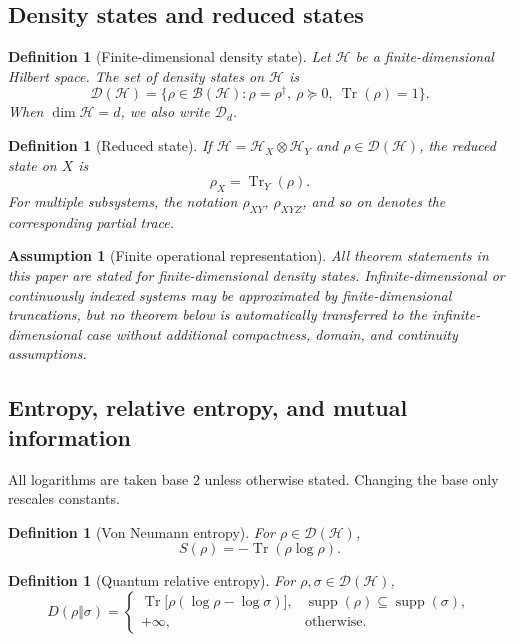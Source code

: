 \documentclass[11pt]{article}
\newtheorem{definition}[theorem]{Definition}
\newtheorem{assumption}[theorem]{Assumption}
\newcommand{\D}{\mathcal{D}}
\newcommand{\Hcal}{\mathcal{H}}
\newcommand{\Tr}{\operatorname{Tr}}
\newcommand{\supp}{\operatorname{supp}}
\newcommand{\1}{\mathbf{1}}
\begin{document}
\subsection{Density states and reduced states}

\begin{definition}[Finite-dimensional density state]
Let \(\Hcal\) be a finite-dimensional Hilbert space. The set of density states on \(\Hcal\) is
\[
\D(\Hcal)
=
\{\rho\in\mathcal B(\Hcal):\rho=\rho^\dagger,\ \rho\succeq0,\ \Tr(\rho)=1\}.
\]
When \(\dim \Hcal=d\), we also write \(\D_d\).
\end{definition}

\begin{definition}[Reduced state]
If \(\Hcal=\Hcal_X\otimes\Hcal_Y\) and \(\rho\in\D(\Hcal)\), the reduced state on \(X\) is
\[
\rho_X=\Tr_Y(\rho).
\]
For multiple subsystems, the notation \(\rho_{XY}\), \(\rho_{XYZ}\), and so on denotes the corresponding partial trace.
\end{definition}

\begin{assumption}[Finite operational representation]
All theorem statements in this paper are stated for finite-dimensional density states. Infinite-dimensional or continuously indexed systems may be approximated by finite-dimensional truncations, but no theorem below is automatically transferred to the infinite-dimensional case without additional compactness, domain, and continuity assumptions.
\end{assumption}

\subsection{Entropy, relative entropy, and mutual information}

All logarithms are taken base \(2\) unless otherwise stated. Changing the base only rescales constants.

\begin{definition}[Von Neumann entropy]
For \(\rho\in\D(\Hcal)\),
\[
S(\rho)=-\Tr(\rho\log \rho).
\]
\end{definition}

\begin{definition}[Quantum relative entropy]
For \(\rho,\sigma\in\D(\Hcal)\),
\[
D(\rho\Vert\sigma)
=
\begin{cases}
\Tr\bigl[\rho(\log\rho-\log\sigma)\bigr], & \supp(\rho)\subseteq\supp(\sigma),\\
+\infty, & \text{otherwise.}
\end{cases}
\]
\end{definition}
\end{document}
